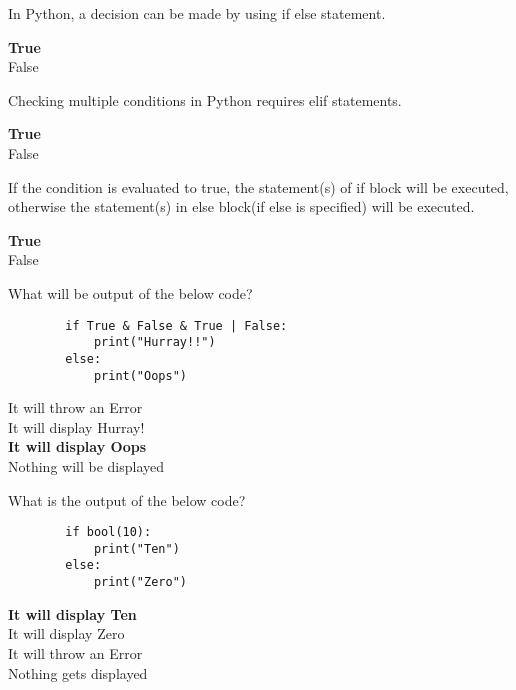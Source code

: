 \documentclass{exam}
\begin{document}
\begin{questions}
    \question  In Python, a decision can be made by using if else statement.

    \begin{oneparchoices}
        \choice \textbf{True} \\
        \choice False
    \end{oneparchoices}
    \question Checking multiple conditions in Python requires elif statements.

    \begin{oneparchoices}
        \choice \textbf{True} \\
        \choice False
    \end{oneparchoices}

    \question If the condition is evaluated to true, the statement(s) of if block will be executed, otherwise the statement(s) in else block(if else is specified) will be executed.

    \begin{oneparchoices}
        \choice \textbf{True} \\
        \choice False
    \end{oneparchoices}

    \question What will be output of the below code?

    \begin{verbatim}
        if True & False & True | False:
            print("Hurray!!")
        else:
            print("Oops")
    \end{verbatim}

    \begin{oneparchoices}
        \choice It will throw an Error \\
        \choice It will display Hurray!  \\
        \choice \textbf{It will display Oops} \\
        \choice  Nothing will be displayed
    \end{oneparchoices}

    \question What is the output of the below code?

    \begin{verbatim}
        if bool(10):
            print("Ten")
        else:
            print("Zero")
    \end{verbatim}
    \begin{oneparchoices}
        \choice \textbf{It will display Ten} \\
        \choice It will display Zero \\
        \choice It will throw an Error \\
        \choice Nothing gets displayed 
    \end{oneparchoices}
    

\end{questions}
\end{document}
